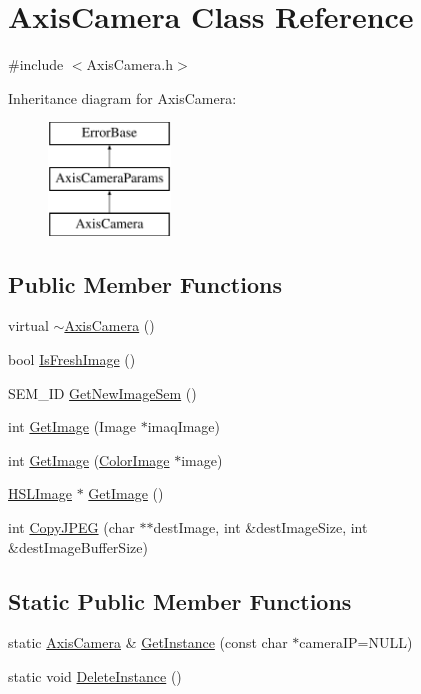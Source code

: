 \hypertarget{classAxisCamera}{
\section{AxisCamera Class Reference}
\label{classAxisCamera}
}


{\ttfamily \#include $<$AxisCamera.h$>$}

Inheritance diagram for AxisCamera:\begin{figure}[H]
\begin{center}
\leavevmode
\includegraphics[height=3.000000cm]{classAxisCamera}
\end{center}
\end{figure}
\subsection*{Public Member Functions}
\begin{DoxyCompactItemize}
\item 
virtual \hyperlink{classAxisCamera_af3cfcbe46afbf5e736856ab3416c4093}{$\sim$AxisCamera} ()
\item 
bool \hyperlink{classAxisCamera_a2841ee4826be6e2780132cb886cb0fce}{IsFreshImage} ()
\item 
SEM\_\-ID \hyperlink{classAxisCamera_a3ac658a9b7a8e6ac88dfe643a4affc6f}{GetNewImageSem} ()
\item 
int \hyperlink{classAxisCamera_a6434eefd970c81af8d12bc2e40db7219}{GetImage} (Image $\ast$imaqImage)
\item 
int \hyperlink{classAxisCamera_aa23454100abdc01129f43f77e92ff3d6}{GetImage} (\hyperlink{classColorImage}{ColorImage} $\ast$image)
\item 
\hyperlink{classHSLImage}{HSLImage} $\ast$ \hyperlink{classAxisCamera_a471281984345a79176e4920d5e6dea8a}{GetImage} ()
\item 
int \hyperlink{classAxisCamera_a0e608c3e60d76029b9f0fda094ba2735}{CopyJPEG} (char $\ast$$\ast$destImage, int \&destImageSize, int \&destImageBufferSize)
\end{DoxyCompactItemize}
\subsection*{Static Public Member Functions}
\begin{DoxyCompactItemize}
\item 
static \hyperlink{classAxisCamera}{AxisCamera} \& \hyperlink{classAxisCamera_ac0ded6e2137ed5b704ad3b6fba041078}{GetInstance} (const char $\ast$cameraIP=NULL)
\item 
static void \hyperlink{classAxisCamera_aa78c5611fb79057a41460bda0ff4d4ae}{DeleteInstance} ()
\end{DoxyCompactItemize}


